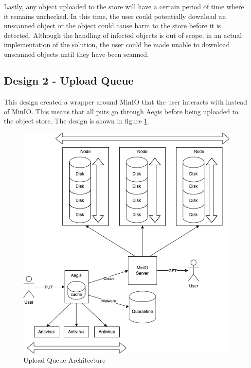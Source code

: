 \documentclass[12pt, conference, final, a4paper, onecolumn, compsoc]{IEEEtran}
\begin{document}
Lastly, any object uploaded to the store will have a certain period of time
where it remains unchecked. In this time, the user could potentially download an
unscanned object or the object could cause harm to the store before it is
detected. Although the handling of infected objects is out of scope, in an
actual implementation of the solution, the user could be made unable to download
unscanned objects until they have been scanned.


\subsection*{Design 2 - Upload Queue}
\paragraph{}

This design created a wrapper around MinIO that the user interacts with instead
of MinIO. This means that all puts go through Aegis before being uploaded to the
object store. The design is shown in figure \ref{fig:uploadQueueArch}.

\begin{figure}
  \centering \includegraphics[scale=.4]{diagrams/upload-queue.png}
  \caption{Upload Queue Architecture}
  \label{fig:uploadQueueArch}
\end{figure}
\end{document}
